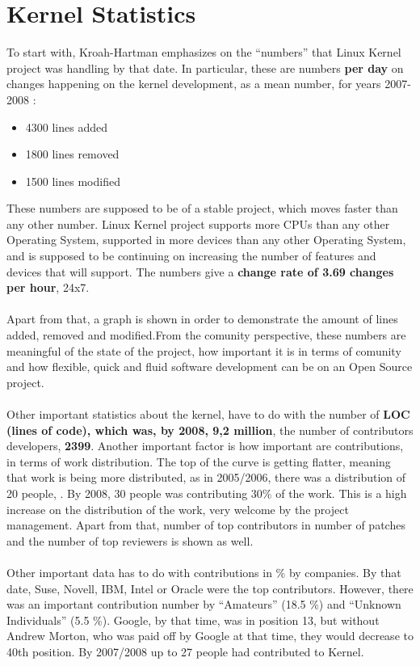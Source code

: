 \documentclass[11pt]{article}
\begin{document}
\section{Kernel Statistics}
To start with, Kroah-Hartman emphasizes on the ``numbers'' that Linux Kernel project was handling by that date. In particular, these are numbers \textbf{per day} on changes happening on the kernel development, as a mean number, for years 2007-2008 :
\begin{itemize}\itemsep0pt
\item{4300 lines added}
\item{1800 lines removed}
\item{1500 lines modified}
\end{itemize}
These numbers are supposed to be of a stable project, which moves faster than any other number. Linux Kernel project supports more CPUs than any other Operating System, supported in more devices than any other Operating System, and is supposed to be continuing on increasing the number of features and devices that will support. The numbers give a \textbf{change rate of 3.69 changes per hour}, 24x7.\\
\\
Apart from that, a graph is shown in order to demonstrate the amount of lines added, removed and modified.From the comunity perspective, these numbers are meaningful of the state of the project, how important it is in terms of comunity and how flexible, quick and fluid software development can be on an Open Source project.\\
\\
Other important statistics about the kernel, have to do with the number of \textbf{LOC (lines of code), which was, by 2008, 9,2 million}, the number of contributors developers, \textbf{2399}. Another important factor is how important are contributions, in terms of work distribution. The top of the curve is getting flatter, meaning that work is being more distributed, as in 2005/2006, there was a distribution of 20 people, . By 2008, 30 people was contributing 30\% of the work. This is a high increase on the distribution of the work, very welcome by the project management. Apart from that, number of top contributors in number of patches and the number of top reviewers is shown as well.\\
\\
Other important data has to do with contributions in \% by companies. By that date, Suse, Novell, IBM, Intel or Oracle were the top contributors. However, there was an important contribution number by ``Amateurs'' (18.5 \%) and ``Unknown Individuals'' (5.5 \%). Google, by that time, was in position 13, but without Andrew Morton, who was paid off by Google at that time, they would decrease to 40th position. By 2007/2008 up to 27 people had contributed to Kernel.
\end{document}
